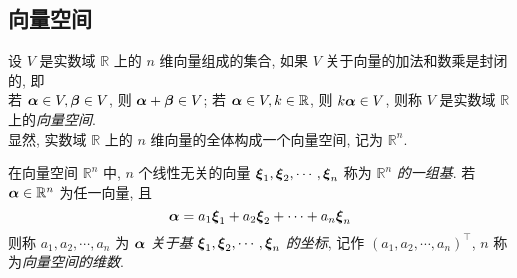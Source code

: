 \subsection{向量空间}

\begin{definition}[向量空间]
    设 $ V $ 是实数域 $ \mathbb{R} $ 上的 $ n $ 维向量组成的集合, 如果 $ V $ 关于向量的加法和数乘是封闭的, 即\\
    若 $ \vb*{\alpha} \in V, \vb*{\beta} \in V $, 则 $ \vb*{\alpha}+\vb*{\beta} \in V $; 若 $ \vb*{\alpha} \in V, k \in \mathbb{R} $, 则 $ k \vb*{\alpha} \in V $, 则称 $ V $ 是实数域 $ \mathbb{R} $ 上的\textit{向量空间}.\\
    显然, 实数域 $ \mathbb{R} $ 上的 $ n $ 维向量的全体构成一个向量空间, 记为 $ \mathbb{R}^{n} $.
\end{definition}

\begin{definition}[基与维数]
    在向量空间 $ \mathbb{R}^{n} $ 中, $ n $ 个线性无关的向量 $ \vb*{\xi}_{1}, \vb*{\xi}_{2}, \cdots, \vb*{\xi}_{n} $ 称为 $ \mathbb{R}^{n} $ \textit{的一组基}. 若 $ \vb*{\alpha} \in \mathbb{R}^{n} $ 为任一向量, 且
    $$\vb*{\alpha}=a_{1} \vb*{\xi}_{1}+a_{2} \vb*{\xi}_{2}+\cdots+a_{n} \vb*{\xi}_{n}$$
    则称 $ a_{1}, a_{2}, \cdots, a_{n} $ 为 $ \vb*{\alpha} $ \textit{关于基} $ \vb*{\xi}_{1}, \vb*{\xi}_{2}, \cdots, \vb*{\xi}_{n} $ \textit{的坐标}, 记作 $ \left(a_{1}, a_{2}, \cdots, a_{n}\right)^{\top} $, $n$ 称为\textit{向量空间的维数}.
\end{definition}

